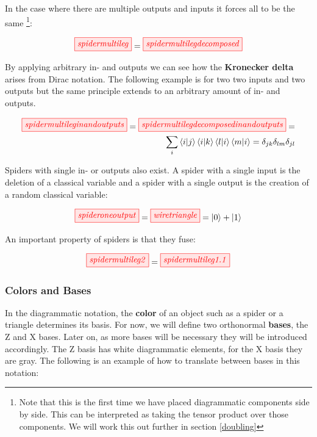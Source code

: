 \documentclass[]{article}
\begin{document}
In the case where there are multiple outputs and inputs it forces all to be the same \footnote{Note that this is the first time we have placed diagrammatic components side by side. This can be interpreted as taking the tensor product over those components. We will work this out further in section \ref{doubling}}:

\begin{equation}
\tikzfig{spidermultileg} = \tikzfig{spidermultilegdecomposed}
\end{equation}

By applying arbitrary in- and outputs we can see how the \textbf{Kronecker delta} arises from Dirac notation. The following example is for two two inputs and two outputs but the same principle extends to an arbitrary amount of in- and outputs.

\begin{equation}
\begin{split}
\tikzfig{spidermultileginandoutputs} = \tikzfig{spidermultilegdecomposedinandoutputs} = \\ \sum_{i} \bra{i}\ket{j}\bra{i}\ket{k}\bra{l}\ket{i}\bra{m}\ket{i} = \delta_{jk} \delta_{lm}  \delta_{jl}
\end{split}
\end{equation}

Spiders with single in- or outputs also exist. A spider with a single input is the deletion of a classical variable and a spider with a single output is the creation of a random classical variable:

\begin{equation}
\tikzfig{spideroneoutput} = \tikzfig{wiretriangle} = \ket{0} + \ket{1}
\end{equation}

An important property of spiders is that they fuse:

\begin{equation}
\label{equation:spiderfusion}
	\tikzfig{spidermultileg2} = \tikzfig{spidermultileg1.1}
\end{equation}



\subsubsection{Colors and Bases}
\label{coloursandbases}

In the diagrammatic notation, the \textbf{color} of an object such as a spider or a triangle determines its basis. For now, we will define two orthonormal \textbf{bases}, the Z and X bases. Later on, as more bases will be necessary they will be introduced accordingly. The Z basis has white diagrammatic elements, for the X basis they are gray. The following is an example of how to translate between bases in this notation:
\end{document}
